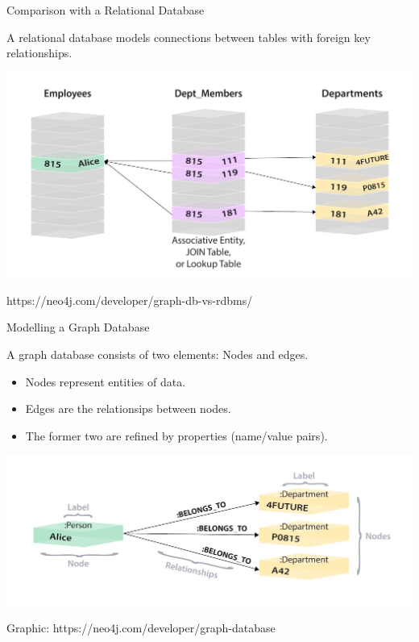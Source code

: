 \documentclass{beamer}
\begin{document}
    \begin{frame}{Comparison with a Relational Database}
    
      A relational database models connections between tables with foreign key relationships.
      
      \begin{center}
        \includegraphics[scale=.2]{relational_as_graph}
      \end{center}
      
      https://neo4j.com/developer/graph-db-vs-rdbms/
      
    \end{frame}
    
    \begin{frame}{Modelling a Graph Database}

      A graph database consists of two elements: Nodes and edges.

      \begin{itemize}

        \item Nodes represent entities of data.
        \item Edges are the relationsips between nodes.\pause
        \item The former two are refined by properties (name/value pairs).
      \end{itemize}
      
      \begin{center}
        \includegraphics[scale=.2]{relational_graph_model}
      \end{center}
      
      Graphic: https://neo4j.com/developer/graph-database
      
    \end{frame}
    
\end{document}
